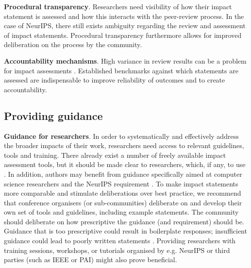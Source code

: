 \documentclass[11pt,english]{article}
\begin{document}
	\textbf{Procedural transparency}. Researchers need visibility of how their impact statement is assessed and how this interacts with the peer-review process. In the case of NeurIPS, there still exists ambiguity regarding the review and assessment of impact statements. Procedural transparency furthermore allows for improved deliberation on the process by the community. 
	
	\textbf{Accountability mechanisms}. High variance in review results can be a problem for impact assessments \citep{larson_survey_2004,shah_how_2004,mcwilliams_problematic_2003,goldman_inconsistency_1982}. Established benchmarks against which statements are assessed are indispensable to improve reliability of outcomes and to create accountability. 
	
	\subsection*{Providing guidance}
	
	\textbf{Guidance for researchers}. In order to systematically and effectively address the broader impacts of their work, researchers need access to relevant guidelines, tools and training. There already  exist a number of freely available impact assessment tools, but it should be made clear to researchers, which, if any, to use \citep{responsible_research_and_innovation_toolkit_nodate}. %
	In addition, authors may benefit from guidance specifically aimed at computer science researchers and the NeurIPS requirement \citep{ai_ethics_lab_homepage_2020,ashurst_guide_2020,hecht_suggestions_2020}. To make impact statements more comparable and stimulate deliberations over best practice, we recommend that conference organisers (or sub-communities) deliberate on and develop their own set of tools and guidelines, including example statements. The community should deliberate on how prescriptive the guidance (and requirement) should be. Guidance that is too prescriptive could result in boilerplate responses; insufficient guidance could lead to poorly written statements \citep{owen_responsible_2010}. Providing researchers with training sessions, workshops, or tutorials organised by e.g. NeurIPS or third parties (such as IEEE or PAI) might also prove beneficial. 
	
\end{document}
